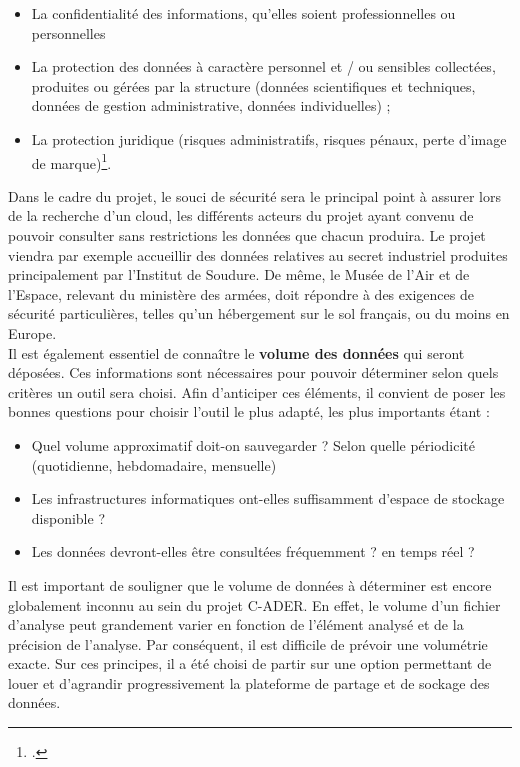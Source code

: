 \begin{itemize}
	\item La confidentialité des informations, qu’elles soient professionnelles ou personnelles
	\item La protection des données à caractère personnel et / ou sensibles collectées, produites ou gérées par la structure (données scientifiques et techniques, données de gestion administrative, données individuelles) ;
	\item La protection juridique (risques administratifs, risques pénaux, perte d’image de marque)\footcite{hadrossekGuideBonnesPratiques}.
\end{itemize}

Dans le cadre du projet, le souci de sécurité sera le principal point à assurer lors de la recherche d'un cloud, les différents acteurs du projet ayant convenu de pouvoir consulter sans restrictions les données que chacun produira. Le projet viendra par exemple accueillir des données relatives au secret industriel produites principalement par l’Institut de Soudure. De même, le Musée de l’Air et de l’Espace, relevant du ministère des armées, doit répondre à des exigences de sécurité particulières, telles qu’un hébergement sur le sol français, ou du moins en Europe.\\

Il est également essentiel de connaître le \textbf{volume des données} qui seront déposées. Ces informations sont nécessaires pour pouvoir déterminer selon quels critères un outil sera choisi. Afin d’anticiper ces éléments, il convient de poser les bonnes questions pour choisir l’outil le plus adapté, les plus importants étant :\\
\begin{itemize}
      \item Quel volume approximatif doit-on sauvegarder ? Selon quelle périodicité (quotidienne, hebdomadaire, mensuelle)
      \item Les infrastructures informatiques ont-elles suffisamment d’espace de stockage disponible ?
      \item Les données devront-elles être consultées fréquemment ? en temps réel ?
\end{itemize}

Il est important de souligner que le volume de données à déterminer est encore globalement inconnu au sein du projet C-ADER. En effet, le volume d’un fichier d’analyse peut grandement varier en fonction de l’élément analysé et de la précision de l’analyse. Par conséquent, il est difficile de prévoir une volumétrie exacte. Sur ces principes, il a été choisi de partir sur une option permettant de louer et d’agrandir progressivement la plateforme de partage et de sockage des données.\\

